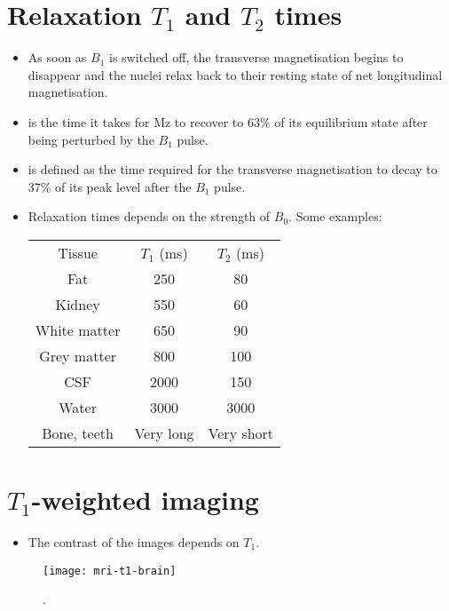 \section{Relaxation $T_1$ and $T_2$ times}
\begin{itemize}
\item As soon as $B_1$ is switched off, the transverse magnetisation
  begins to disappear and the nuclei relax back to their resting state
  of net longitudinal magnetisation. 
\item {} is the time it takes for Mz to recover to 63\% of its
  equilibrium state after being perturbed by the $B_1$ pulse.
\item {} is
  defined as the time required for the transverse magnetisation to
  decay to 37\% of its peak level after the $B_1$ pulse.
\item Relaxation times depends on the strength of $B_0$. Some examples:
  \begin{tabular}{ccc}
    Tissue & $T_1$ (ms) & $T_2$ (ms) \\
    Fat & 250 & 80 \\
    Kidney & 550 &  60 \\
    White matter & 650 & 90 \\
    Grey matter & 800 & 100 \\
    CSF & 2000 & 150 \\
    Water & 3000 & 3000 \\
    Bone, teeth & Very long & Very short
  \end{tabular}
\end{itemize}

\section{$T_1$-weighted imaging}
\begin{itemize}
\item The contrast of the images depends on $T_1$.
\end{itemize}
\vspace{-4ex}
\begin{figure}[!b]
  \centering
  \texttt{[image: mri-t1-brain]}
  \caption{ \cite{abdulla2025MRI_intro}.}
  \label{fig:MRI-intro-netmag}
\end{figure}

